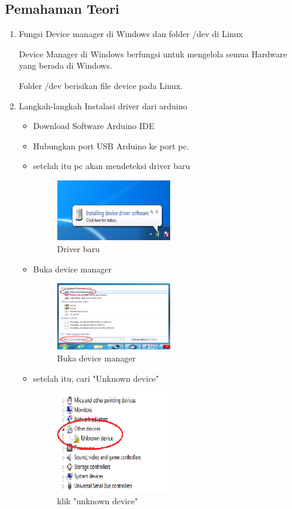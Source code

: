 \subsection{Pemahaman Teori}
\begin{enumerate}
\item Fungsi Device manager di Windows dan folder /dev di Linux

Device Manager di Windows berfungsi untuk mengelola semua Hardware yang berada di Windows.

Folder /dev berisikan file device pada Linux.

\item Langkah-langkah Instalasi driver dari arduino

\begin{itemize}
\item Download Software Arduino IDE
\item Hubungkan port USB Arduino ke port pc.
\item setelah itu pc akan mendeteksi driver baru

\begin{figure}[ht!]
\includegraphics[width=5cm]{figures/5/1174069/1fny.png}
\centering
		\caption{Driver baru}
\end{figure}
	
\item Buka device manager

\begin{figure}[ht!]
\includegraphics[width=5cm]{figures/5/1174069/2fny.png}
\centering
		\caption{Buka device manager}
\end{figure}
	
	
\item setelah itu, cari "Unknown device"

\begin{figure}[ht!]
\includegraphics[width=5cm]{figures/5/1174069/3fny.png}
\centering
		\caption{klik "unknown device"}
\end{figure}
	

\end{itemize}
\end{enumerate}
